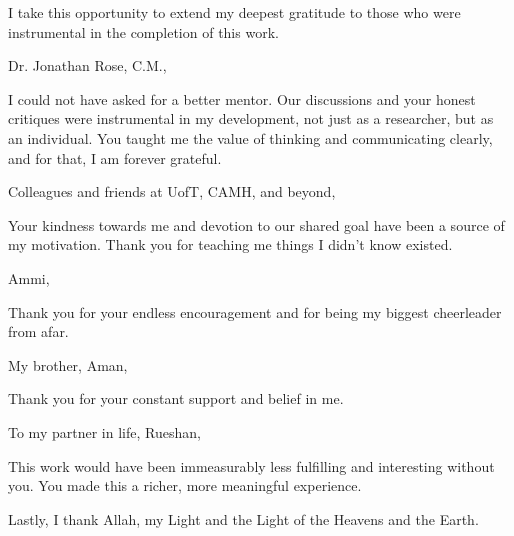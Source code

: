 \noindent I take this opportunity to extend my deepest gratitude to those who were instrumental in the completion of this work.\par

\noindent Dr. Jonathan Rose, C.M.,\vspace{-5pt}
\begin{addmargin}[1em]{2em}
I could not have asked for a better mentor. Our discussions and your honest critiques were instrumental in my development, not just as a researcher, but as an individual. You taught me the value of thinking and communicating clearly, and for that, I am forever grateful.
\end{addmargin}

\noindent Colleagues and friends at UofT, CAMH, and beyond,\vspace{-5pt}
\begin{addmargin}[1em]{2em}
Your kindness towards me and devotion to our shared goal have been a source of my motivation. Thank you for teaching me things I didn't know existed.
\end{addmargin}

\noindent Ammi,\vspace{-5pt}
\begin{addmargin}[1em]{2em}
Thank you for your endless encouragement and for being my biggest cheerleader from afar.
\end{addmargin}

\noindent My brother, Aman,\vspace{-5pt}
\begin{addmargin}[1em]{2em}
Thank you for your constant support and belief in me.
\end{addmargin}


\noindent To my partner in life, Rueshan,\vspace{-5pt}
\begin{addmargin}[1em]{2em}
This work would have been immeasurably less fulfilling and interesting without you. You made this a richer, more meaningful experience.
\end{addmargin}

\noindent Lastly, I thank Allah, my Light and the Light of the Heavens and the Earth.